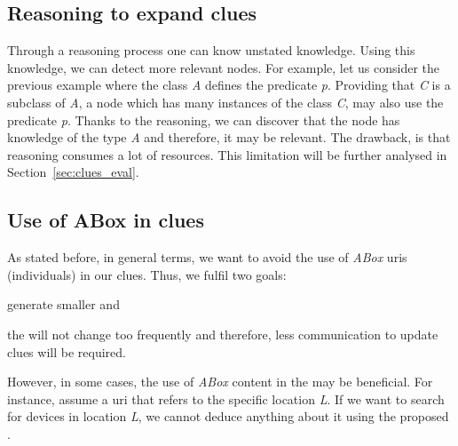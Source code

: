 \subsection{Reasoning to expand clues} %
Through a reasoning process one can know unstated knowledge.
Using this knowledge, we can detect more relevant nodes.
For example, let us consider the previous example where the class \emph{A} defines the predicate \emph{p}.
Providing that \emph{C} is a subclass of \emph{A}, a node which has many instances of the class \emph{C}, may also use the predicate \emph{p}.
Thanks to the reasoning, we can discover that the node has knowledge of the type \emph{A} and therefore, it may be relevant.
The drawback, is that reasoning consumes a lot of resources.
This limitation will be further analysed in Section~\ref{sec:clues_eval}.


\subsection{Use of ABox in clues}
\label{sec:aboxinclues}
As stated before, in general terms, we want to avoid the use of \emph{ABox} \acp{uri} (individuals) in our clues.
Thus, we fulfil two goals:
\begin{enumerate*}[label=\itshape(\arabic*\upshape)]
  \item generate smaller \clues{} and
  \item the \clues{} will not change too frequently and therefore, less communication to update clues will be required.
\end{enumerate*}
However, in some cases, the use of \emph{ABox} content in the \clues{} may be beneficial.
For instance, assume a \ac{uri} that refers to the specific location \emph{L}.
If we want to search for devices in location \emph{L}, we cannot deduce anything about it using the proposed \clues{}.

